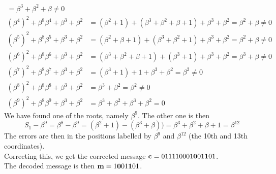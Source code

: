 \documentclass[11pt]{article}
\renewcommand{\vec}[1]{\mathbf{#1}}
\begin{document}
\begin{itemize}
\begin{align*}
                      =  \beta^3 + \beta^2 + \beta
                      \neq 0\\
                        (\beta^4)^2 + \beta^8\beta^4 + \beta^3 + \beta^2
                     &= (\beta^2 + 1) + (\beta^3 + \beta^2+\beta+1) + \beta^3 + \beta^2
                      =  \beta^2 + \beta
                      \neq 0\\
                        (\beta^5)^2 + \beta^8\beta^5 + \beta^3 + \beta^2
                     &= (\beta^2 + \beta + 1) + (\beta^3 + \beta^2 + 1) + \beta^3 + \beta^2
                      =  \beta^2 + \beta
                      \neq 0\\
                        (\beta^6)^2 + \beta^8\beta^6 + \beta^3 + \beta^2
                     &= (\beta^3 + \beta^2 + \beta + 1) + (\beta^3 + 1) + \beta^3 + \beta^2
                      =  \beta^3 + \beta
                      \neq 0\\
                        (\beta^7)^2 + \beta^8\beta^7 + \beta^3 + \beta^2
                     &= (\beta^3 + 1) + 1 + \beta^3 + \beta^2
                      =  \beta^2
                      \neq 0\\
                        (\beta^8)^2 + \beta^8\beta^8 + \beta^3 + \beta^2
                     &=  \beta^3 + \beta^2
                      =  \beta^2
                      \neq 0\\
                        (\beta^9)^2 + \beta^8\beta^9 + \beta^3 + \beta^2
                     &=  \beta^3 + \beta^2 + \beta^3 + \beta^2
                      = 0
                   \end{align*}
                   We have found one of the roots, namely $\beta^9$.
                   The other one is then
                   \[
                     S_1 - \beta^9 = \beta^8-\beta^9
                                   = (\beta^2+1) - (\beta^3+\beta))
                                   = \beta^3+\beta^2+\beta+1
                                   = \beta^{12}
                   \]
                   The errors are then in the positions labelled by $\beta^9$ and $\beta^{12}$
                   (the 10th and 13th coordinates).\\
                   Correcting this, we get the corrected message
                   $\vec{c} = \text{011110001\textbf{0}01\textbf{1}01}$.\\
                   The decoded message is then $\vec{m} = \text{1\textbf{0}01\textbf{1}01}$.
\end{itemize}
\end{document}
